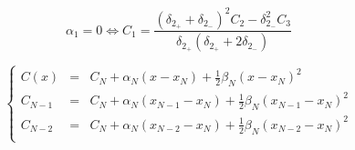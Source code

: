 \documentclass[aps,11pt]{revtex4}
\begin{document}
\begin{equation}
	\alpha_1 = 0  \iff C_1 = \dfrac{ (\delta_{2_+}+\delta_{2_-})^2  C_2 - \delta_{2_-}^2 C_3}{\delta_{2_+}(\delta_{2_+}+2\delta_{2_-})}
\end{equation}

\begin{equation}
\left\lbrace
\begin{array}{rcl}
	C(x)    & = & C_N + \alpha_N (x-x_N) + \frac{1}{2}\beta_N (x-x_N)^2\\
	C_{N-1} & = & C_N + \alpha_N (x_{N-1}-x_{N}) +  \frac{1}{2}\beta_N (x_{N-1}-x_{N}) ^2\\
	C_{N-2} & = & C_N + \alpha_N (x_{N-2}-x_{N}) +  \frac{1}{2}\beta_N (x_{N-2}-x_{N}) ^2\\
\end{array}
\right.
\end{equation}
\end{document}
